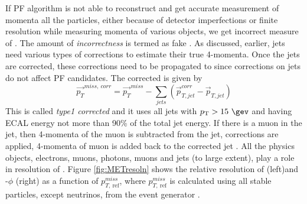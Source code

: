 If PF algorithm is not able to reconstruct and get accurate measurement of momenta all the particles, either because of detector imperfections or finite resolution while measuring momenta of various objects, we get incorrect measure of \ptmiss. The amount of \textit{incorrectness} is termed as fake \ptmiss. As discussed, earlier, jets need various types of corrections to estimate their true 4-momenta. Once the jets are corrected, these corrections need to be propagated to \ptmiss since corrections on jets do not affect PF candidates. The corrected \ptmiss is given by
\begin{equation}
\vec{p_{T}}^{miss,\ corr} = \vec{p_{T}}^{miss} - \sum_{jets}^{}(\vec{p}_{T,jet}^{corr} - \vec{p}_{T,jet}) 
\end{equation}
This \ptmiss is called \textit{type1 corrected \ptmiss} and it uses all jets with $\pt > 15\ \gev$ and having ECAL energy not more than 90\% of the total jet energy. If there is a muon in the jet, then 4-momenta of the muon is subtracted from the jet, corrections are applied, 4-momenta of muon is added back to the corrected jet \cite{CMS-PAS-JME-16-004}.
All the physics objects, electrons, muons, photons, muons and jets (to large extent), play a role in resolution of \ptmiss. Figure \ref{fig:METresoln} shows the relative resolution of \ptmiss (left)and \ptmiss-$\phi$ (right) as a function of $p_{T,\ \mathrm{ref}}^{miss}$, where $p_{T,\ \mathrm{ref}}^{miss}$ is calculated using all stable particles, except neutrinos, from the event generator \cite{CMS-PRF-14-001}.


